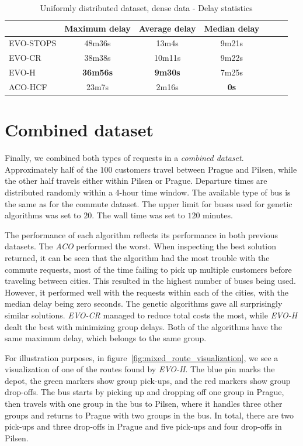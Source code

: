 \begin{table}
    \centering
    \begin{tabular}{lcccccc}
         &  Maximum delay & Average delay & Median delay \\
         \hline
         EVO-STOPS & 48m36s & 13m4s & 9m21s \\
         EVO-CR & 38m38s & 10m11s & 9m22s \\
         EVO-H & \textbf{36m56s} & \textbf{9m30s} & 7m25s \\
         ACO-HCF & 23m7s & 2m16s & \textbf{0s} \\
    \end{tabular}
    \caption{Uniformly distributed dataset, dense data - Delay statistics}
    \label{tab:exp_random_dense_delay_stats}
\end{table}

\clearpage

\section{Combined dataset}

Finally, we combined both types of requests in a \textit{combined dataset}. Approximately half of the $100$ customers travel between Prague and Pilsen, while the other half travels either within Pilsen or Prague. Departure times are distributed randomly within a 4-hour time window. The available type of bus is the same as for the commute dataset. The upper limit for buses used for genetic algorithms was set to $20$. The wall time was set to $120$ minutes.

The performance of each algorithm reflects its performance in both previous datasets. The \textit{ACO} performed the worst. When inspecting the best solution returned, it can be seen that the algorithm had the most trouble with the commute requests, most of the time failing to pick up multiple customers before traveling between cities. This resulted in the highest number of buses being used. However, it performed well with the requests within each of the cities, with the median delay being zero seconds. The genetic algorithms gave all surprisingly similar solutions. \textit{EVO-CR}
managed to reduce total costs the most, while \textit{EVO-H} dealt the best with minimizing group delays. Both of the algorithms have the same maximum delay, which belongs to the same group.

For illustration purposes, in figure~\ref{fig:mixed_route_visualization}, we see a visualization of one of the routes found by \textit{EVO-H}. The blue pin marks the depot, the green markers show group pick-ups, and the red markers show group drop-offs. The bus starts by picking up and dropping off one group in Prague, then travels with one group in the bus to Pilsen, where it handles three other groups and returns to Prague with two groups in the bus. In total, there are two pick-ups and three drop-offs in Prague and five pick-ups and four drop-offs in Pilsen.

